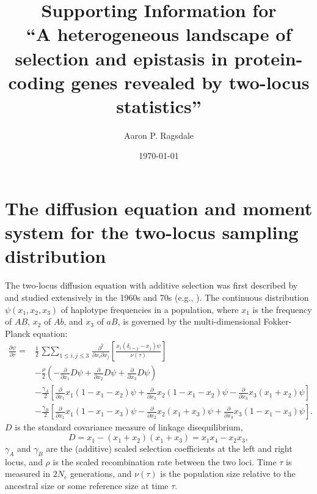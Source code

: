 \documentclass[]{article}
\begin{document}
\title{Supporting Information for\\
``A heterogeneous landscape of selection and epistasis in protein-coding genes revealed by two-locus statistics''}
\author[]{Aaron P. Ragsdale}
\date{\today}
\maketitle

\renewcommand{\thefigure}{S\arabic{figure}}
\renewcommand{\thetable}{S\arabic{table}}
\renewcommand{\theequation}{S\arabic{equation}}
\renewcommand{\thesection}{S\arabic{section}}
\setcounter{figure}{0}
\setcounter{table}{0}
\setcounter{equation}{0}
\setcounter{section}{0}

\tableofcontents
\newpage

\clearpage

\section{The diffusion equation and moment system for the two-locus sampling distribution}

The two-locus diffusion equation with additive selection was first described by
\citet{Kimura1955-qe} and studied extensively in the 1960s and 70s (e.g.,
\citet{Hill1966-gv,Ohta1969-ie}). The continuous distribution \(\psi(x_1, x_2,
x_3)\) of haplotype frequencies in a population, where \(x_1\) is the frequency
of \(AB\), \(x_2\) of \(Ab\), and \(x_3\) of \(aB\), is governed by the
multi-dimensional Fokker-Planck equation:
\begin{align} \label{eq:diffeq}
\frac{\partial \psi}{\partial \tau} = &
\frac{1}{2}\mathop{\sum\sum}_{1\leq i, j \leq 3}
\frac{\partial^2}{\partial x_i \partial x_j}
\left[\frac{x_i(\delta_{i=j}-x_j)\psi}{\nu(\tau)}\right] \\\nonumber
& -\frac{\rho}{2}\left(-\frac{\partial}{\partial x_1} D\psi
  + \frac{\partial}{\partial x_2} D\psi
  + \frac{\partial}{\partial x_3} D\psi\right) \\\nonumber
& - \frac{\gamma_A}{2}\left[
  \frac{\partial}{\partial x_1} x_1(1-x_1-x_2)\psi
  + \frac{\partial}{\partial x_2} x_2(1-x_1-x_2)\psi
  - \frac{\partial}{\partial x_3} x_3(x_1+x_2)\psi
  \right] \\\nonumber
& -\frac{\gamma_B}{2}\left[
  \frac{\partial}{\partial x_1} x_1(1-x_1-x_3)\psi
  - \frac{\partial}{\partial x_2} x_2(x_1+x_3)\psi
  + \frac{\partial}{\partial x_3} x_3(1-x_1-x_3)\psi
  \right].
\end{align}
\(D\) is the standard covariance measure of linkage disequilibrium, \[D=x_1 -
(x_1+x_2)(x_1+x_3) = x_1 x_4 - x_2 x_3,\] \(\gamma_A\) and \(\gamma_B\) are the
(additive) scaled selection coefficients at the left and right locus, and
\(\rho\) is the scaled recombination rate between the two loci. Time \(\tau\) is
measured in \(2N_e\) generations, and \(\nu(\tau)\) is the population size relative
to the ancestral size or some reference size at time \(\tau\).
\end{document}
